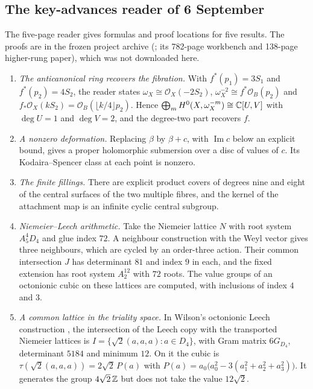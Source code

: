\subsection{The key-advances reader of 6 September}

The five-page reader  gives formulas and proof locations for five results. The proofs are in the frozen project archive (; its 782-page workbench and 138-page higher-rung paper), which was not downloaded here.
\begin{enumerate}[label=\textsf{S6-\arabic*}, leftmargin=3.4em]
\item \emph{The anticanonical ring recovers the fibration.} With $f^*(p_1)=3S_1$ and $f^*(p_2)=4S_2$, the reader states $\omega_X\cong\mathcal O_X(-2S_2)$, $\omega_X^{-2}\cong f^*\mathcal O_B(p_2)$ and $f_*\mathcal O_X(kS_2)=\mathcal O_B(\lfloor k/4\rfloor p_2)$. Hence $\bigoplus_mH^0(X,\omega_X^{-m})\cong\mathbb{C}[U,V]$ with $\deg U=1$ and $\deg V=2$, and the degree-two part recovers $f$.
\item \emph{A nonzero deformation.} Replacing $\beta$ by $\beta+c$, with $\operatorname{Im}c$ below an explicit bound, gives a proper holomorphic submersion over a disc of values of $c$. Its Kodaira--Spencer class at each point is nonzero.
\item \emph{The finite fillings.} There are explicit product covers of degrees nine and eight of the central surfaces of the two multiple fibres, and the kernel of the attachment map is an infinite cyclic central subgroup.
\item \emph{Niemeier--Leech arithmetic.} Take the Niemeier lattice $N$ with root system $A_5^4D_4$ and glue index $72$. A neighbour construction with the Weyl vector gives three neighbours, which are cycled by an order-three action. Their common intersection $J$ has determinant $81$ and index $9$ in each, and the fixed extension has root system $A_2^{12}$ with $72$ roots. The value groups of an octonionic cubic on these lattices are computed, with inclusions of index $4$ and $3$.
\item \emph{A common lattice in the triality space.} In Wilson's octonionic Leech construction \cite{Wilson09}, the intersection of the Leech copy with the transported Niemeier lattices is $I=\{\sqrt2(a,a,a):a\in D_4\}$, with Gram matrix $6G_{D_4}$, determinant $5184$ and minimum $12$. On it the cubic is $\tau(\sqrt2(a,a,a))=2\sqrt2\,P(a)$ with $P(a)=a_0\bigl(a_0^2-3(a_1^2+a_2^2+a_3^2)\bigr)$. It generates the group $4\sqrt2\,\mathbb{Z}$ but does not take the value $12\sqrt2$.
\end{enumerate}

